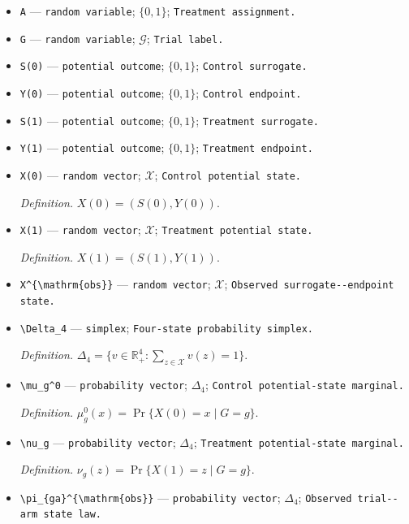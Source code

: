 \documentclass{article}
\begin{document}
\begin{itemize}
  \item \texttt{A} --- \texttt{random variable}; \(\{0,1\}\); \texttt{Treatment assignment.}
  \item \texttt{G} --- \texttt{random variable}; \(\mathcal G\); \texttt{Trial label.}
  \item \texttt{S(0)} --- \texttt{potential outcome}; \(\{0,1\}\); \texttt{Control surrogate.}
  \item \texttt{Y(0)} --- \texttt{potential outcome}; \(\{0,1\}\); \texttt{Control endpoint.}
  \item \texttt{S(1)} --- \texttt{potential outcome}; \(\{0,1\}\); \texttt{Treatment surrogate.}
  \item \texttt{Y(1)} --- \texttt{potential outcome}; \(\{0,1\}\); \texttt{Treatment endpoint.}
  \item \texttt{X(0)} --- \texttt{random vector}; \(\mathcal X\); \texttt{Control potential state.}
  \par\smallskip\noindent\emph{Definition.} \(X(0)=(S(0),Y(0))\).
  \item \texttt{X(1)} --- \texttt{random vector}; \(\mathcal X\); \texttt{Treatment potential state.}
  \par\smallskip\noindent\emph{Definition.} \(X(1)=(S(1),Y(1))\).
  \item \texttt{X\textasciicircum{}\{\textbackslash{}\allowbreak{}mathrm\{obs\}\allowbreak{}\}\allowbreak{}} --- \texttt{random vector}; \(\mathcal X\); \texttt{Observed surrogate-\allowbreak{}-\allowbreak{}endpoint state.}
  \item \texttt{\textbackslash{}\allowbreak{}Delta\_\allowbreak{}4} --- \texttt{simplex}; \texttt{Four-\allowbreak{}state probability simplex.}
  \par\smallskip\noindent\emph{Definition.} \(\Delta_4=\{v\in\mathbb R_+^4:\sum_{z\in\mathcal X}v(z)=1\}\).
  \item \texttt{\textbackslash{}\allowbreak{}mu\_\allowbreak{}g\textasciicircum{}0} --- \texttt{probability vector}; \(\Delta_4\); \texttt{Control potential-\allowbreak{}state marginal.}
  \par\smallskip\noindent\emph{Definition.} \(\mu_g^0(x)=\Pr\{X(0)=x\mid G=g\}\).
  \item \texttt{\textbackslash{}\allowbreak{}nu\_\allowbreak{}g} --- \texttt{probability vector}; \(\Delta_4\); \texttt{Treatment potential-\allowbreak{}state marginal.}
  \par\smallskip\noindent\emph{Definition.} \(\nu_g(z)=\Pr\{X(1)=z\mid G=g\}\).
  \item \texttt{\textbackslash{}\allowbreak{}pi\_\allowbreak{}\{ga\}\allowbreak{}\textasciicircum{}\{\textbackslash{}\allowbreak{}mathrm\{obs\}\allowbreak{}\}\allowbreak{}} --- \texttt{probability vector}; \(\Delta_4\); \texttt{Observed trial-\allowbreak{}-\allowbreak{}arm state law.}

\end{itemize}
\end{document}

